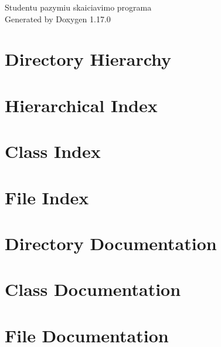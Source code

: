 \documentclass[twoside]{book}
\newcommand{\+}{\discretionary{\mbox{\scriptsize$\hookleftarrow$}}{}{}}
\newcommand{\clearemptydoublepage}{%
    \newpage{\pagestyle{empty}\cleardoublepage}%
  }
\begin{document}
  \raggedbottom
    \hypersetup{pageanchor=false,
                bookmarksnumbered=true,
                pdfencoding=unicode
               }
  \begin{titlepage}
  \vspace*{7cm}
  \begin{center}%
  {\Large Studentu pazymiu skaiciavimo programa}\\
  \vspace*{1cm}
  {\large Generated by Doxygen 1.17.0}\\
  \end{center}
  \end{titlepage}
  \clearemptydoublepage
  \tableofcontents
  \clearemptydoublepage
  \hypersetup{pageanchor=true}

\chapter{Directory Hierarchy}

\chapter{Hierarchical Index}

\chapter{Class Index}

\chapter{File Index}

\chapter{Directory Documentation}

\chapter{Class Documentation}



\chapter{File Documentation}







  \backmatter
  \newpage
  \clearemptydoublepage
  \printindex
\end{document}
